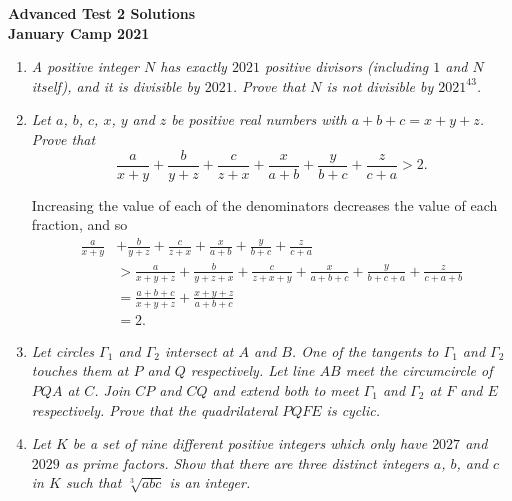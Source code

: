 \documentclass{article}
\begin{document}
\thispagestyle{empty}

\begin{center}
  \textbf{\Large Advanced Test 2 Solutions}
  \\ \vspace{1em}
  \textbf{\large January Camp 2021}
\end{center}

\vspace{24pt}

\begin{enumerate}[1.]

  \item %
  {\itshape A positive integer $N$ has exactly $2021$ positive divisors (including $1$ and $N$ itself), and it is divisible by $2021$.
  Prove that $N$ is not divisible by $2021^{43}$.}
  
  
  \item %
  {\itshape Let $a$, $b$, $c$, $x$, $y$ and $z$ be positive real numbers with $a + b + c = x + y + z$.
  Prove that 
  \[ \frac{a}{x + y} + \frac{b}{y + z} + \frac{c}{z + x} + \frac{x}{a + b} + \frac{y}{b + c} + \frac{z}{c + a} > 2. \]}

  Increasing the value of each of the denominators decreases the value of each fraction, and so
  \begin{align*}
    \frac{a}{x + y} & + \frac{b}{y + z} + \frac{c}{z + x} + \frac{x}{a + b} + \frac{y}{b + c} + \frac{z}{c + a} \\
    & > \frac{a}{x + y + z} + \frac{b}{y + z + x} + \frac{c}{z + x + y} + \frac{x}{a + b + c} + \frac{y}{b + c + a} + \frac{z}{c + a + b} \\
    & = \frac{a + b + c}{x + y + z} + \frac{x + y + z}{a + b + c} \\
    & = 2.
  \end{align*}
  
  
  \item %
  {\itshape Let circles $\Gamma_1$ and $\Gamma_2$ intersect at $A$ and $B$. One of the tangents to $\Gamma_1$ and $\Gamma_2$ touches them at $P$ and $Q$ respectively. Let line $AB$ meet the circumcircle of $PQA$ at $C$. Join $CP$ and $CQ$ and extend both to meet $\Gamma_1$ and $\Gamma_2$ at $F$ and $E$ respectively. Prove that the quadrilateral $PQFE$ is cyclic.}
  
  
  \item %
  {\itshape Let $K$ be a set of nine different positive integers which only have $2027$ and $2029$ as prime factors.
  Show that there are three distinct integers $a$, $b$, and $c$ in $K$ such that $\sqrt[3]{abc}$ is an integer.}
  

\end{enumerate}
\end{document}
